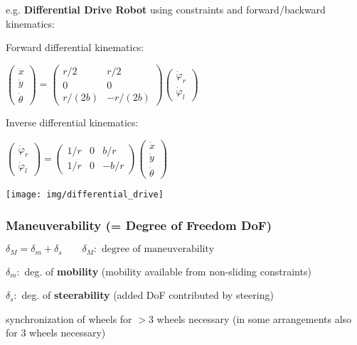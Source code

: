 \documentclass[fontsize=6pt]{scrartcl}
\newcommand{\mat}[1]{\mathbf{#1}}
\begin{document}
\begin{multicols*}{4}
\begin{minipage}{0.65\linewidth}
e.g. \textbf{Differential Drive Robot} using constraints and forward/backward kinematics:

Forward differential kinematics:

$
\begin{pmatrix}
\dot x\\ \dot y\\ \dot \theta
\end{pmatrix}
=
\begin{pmatrix}
r/2 & r/2\\
0 & 0\\
r/(2b) & -r/(2b)
\end{pmatrix}
\begin{pmatrix}
\dot\varphi_r\\
\dot\varphi_l
\end{pmatrix}
$

Inverse differential kinematics:

$
\begin{pmatrix}
\dot\varphi_r\\
\dot{\varphi}_l
\end{pmatrix}
=
\begin{pmatrix}
1/r & 0 & b/r\\
1/r & 0 & -b/r
\end{pmatrix}
\begin{pmatrix}
\dot x\\
\dot y\\
\dot \theta
\end{pmatrix}
$
\end{minipage}
\begin{minipage}{0.35\linewidth}
\texttt{[image: img/differential\_drive]}
\end{minipage}


\subsubsection*{Maneuverability (= Degree of Freedom DoF)}
$\delta_M = \delta_m + \delta_s \qquad \delta_M: \text{ degree of maneuverability}$

$\delta_m:$ deg. of \textbf{mobility} (mobility available from non-sliding constraints)

$\delta_s:$ deg. of \textbf{steerability} (added DoF contributed by steering)

synchronization of wheels for $>3$ wheels necessary (in some arrangements also for 3 wheels necessary)


\end{multicols*}
\end{document}
